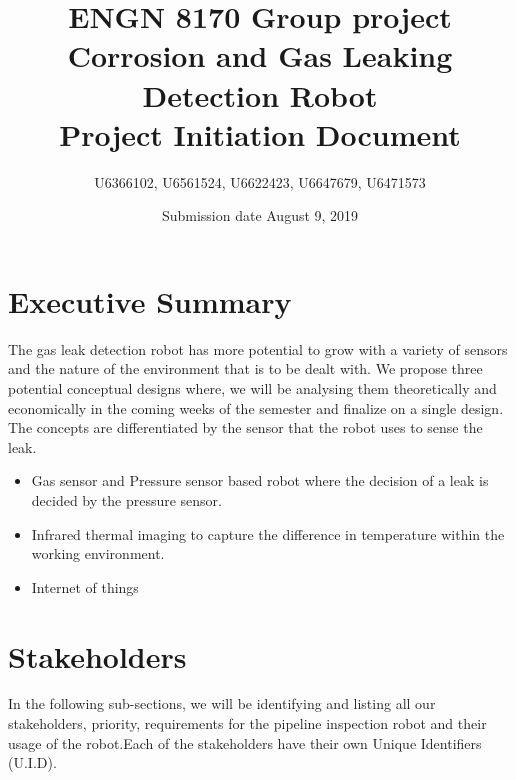 \documentclass[a4paper]{article}
\title{ENGN 8170 Group project\\ Corrosion and Gas Leaking Detection Robot\\ Project Initiation Document}
\author{U6366102, U6561524, U6622423, U6647679, U6471573}
\date{Submission date August 9, 2019}
\begin{document}
\maketitle
\newpage
\tableofcontents
\newpage
\listoftables
\listoffigures
\newpage
{}
\section{Executive Summary}
The gas leak detection robot has more potential to grow with a variety of sensors and the nature of the environment that is to be dealt with. We propose three potential conceptual designs where, we will be analysing them theoretically and economically in the coming weeks of the semester and finalize on a single design. The concepts are differentiated by the sensor that the robot uses to sense the leak.
\begin{itemize}
    \item {Gas sensor and Pressure sensor based robot where the decision of a leak is decided by the pressure sensor.}
    \item{Infrared thermal imaging to capture the difference in temperature within the working environment.}
    \item{Internet of things} %
\end{itemize}
\section{Stakeholders}
In the following sub-sections, we will be identifying and listing all our stakeholders, priority, requirements for the pipeline inspection robot and their usage of the robot.Each of the stakeholders have their own Unique Identifiers (U.I.D). 
\end{document}
